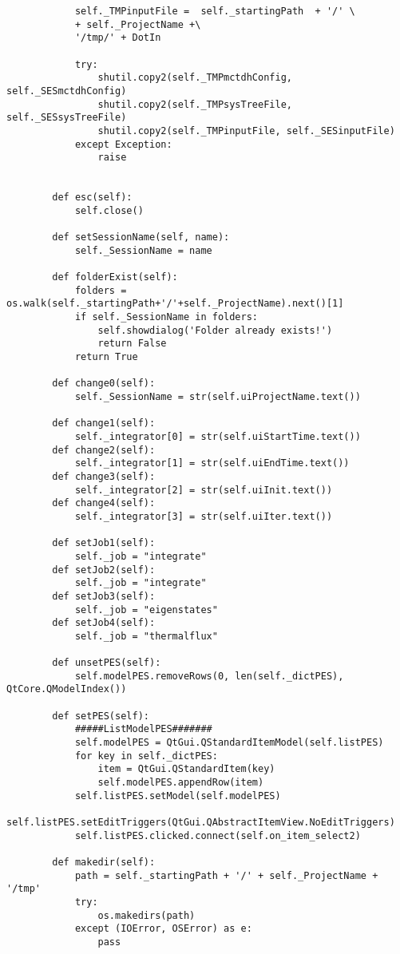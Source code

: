 \begin{verbatim}
            self._TMPinputFile =  self._startingPath  + '/' \
            + self._ProjectName +\
            '/tmp/' + DotIn
    
            try:
                shutil.copy2(self._TMPmctdhConfig, self._SESmctdhConfig) 
                shutil.copy2(self._TMPsysTreeFile, self._SESsysTreeFile)
                shutil.copy2(self._TMPinputFile, self._SESinputFile)
            except Exception:
                raise
            
    
        def esc(self):
            self.close()
    
        def setSessionName(self, name):
            self._SessionName = name
    
        def folderExist(self):
            folders = os.walk(self._startingPath+'/'+self._ProjectName).next()[1]
            if self._SessionName in folders:
                self.showdialog('Folder already exists!')
                return False
            return True
            
        def change0(self):
            self._SessionName = str(self.uiProjectName.text())
    
        def change1(self):
            self._integrator[0] = str(self.uiStartTime.text())
        def change2(self):
            self._integrator[1] = str(self.uiEndTime.text())
        def change3(self):
            self._integrator[2] = str(self.uiInit.text())
        def change4(self):
            self._integrator[3] = str(self.uiIter.text())
    
        def setJob1(self):
            self._job = "integrate"
        def setJob2(self):
            self._job = "integrate"
        def setJob3(self):
            self._job = "eigenstates"
        def setJob4(self):
            self._job = "thermalflux"
    
        def unsetPES(self):
            self.modelPES.removeRows(0, len(self._dictPES), QtCore.QModelIndex())
    
        def setPES(self):
            #####ListModelPES#######
            self.modelPES = QtGui.QStandardItemModel(self.listPES)
            for key in self._dictPES:
                item = QtGui.QStandardItem(key)
                self.modelPES.appendRow(item)
            self.listPES.setModel(self.modelPES)
            self.listPES.setEditTriggers(QtGui.QAbstractItemView.NoEditTriggers)
            self.listPES.clicked.connect(self.on_item_select2)
    
        def makedir(self):
            path = self._startingPath + '/' + self._ProjectName + '/tmp'
            try:
                os.makedirs(path)
            except (IOError, OSError) as e:
                pass
    

\end{verbatim}
